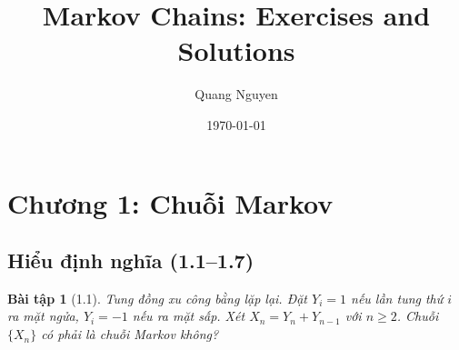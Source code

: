 \documentclass[8pt,a4paper]{article}
\title{Markov Chains: Exercises and Solutions}
\author{Quang Nguyen}
\date{\today}
\newtheorem{exercise}{Bài tập}
\begin{document}
\maketitle

\section*{Chương 1: Chuỗi Markov}

\subsection*{Hiểu định nghĩa (1.1--1.7)}

\begin{exercise}[1.1]
Tung đồng xu công bằng lặp lại. Đặt $Y_i = 1$ nếu lần tung thứ $i$ ra mặt ngửa, $Y_i = -1$ nếu ra mặt sấp. Xét $X_n = Y_n + Y_{n-1}$ với $n \geq 2$. Chuỗi $\{X_n\}$ có phải là chuỗi Markov không?
\end{exercise}
\end{document}
